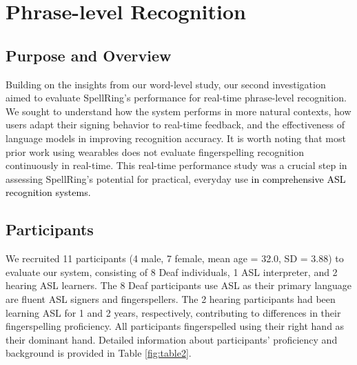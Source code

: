 \section{Phrase-level Recognition}

\subsection{Purpose and Overview}
Building on the insights from our word-level study, our second investigation aimed to evaluate SpellRing's performance for real-time phrase-level recognition. We sought to understand how the system performs in more natural contexts, how users adapt their signing behavior to real-time feedback, and the effectiveness of language models in improving recognition accuracy. It is worth noting that most prior work \cite{paudyal2017dyfav, mummadi2017real} using wearables does not evaluate fingerspelling recognition continuously in real-time. This real-time performance study was a crucial step in assessing SpellRing's potential for practical, everyday use \textcolor{black}{in comprehensive ASL recognition systems.}

\subsection{Participants}
We recruited 11 participants (4 male, 7 female, mean age = 32.0, SD = 3.88) to evaluate our system, consisting of 8 Deaf individuals, 1 ASL interpreter, and 2 hearing ASL learners. The 8 Deaf participants use ASL as their primary language are fluent ASL signers and fingerspellers. The 2 hearing participants had been learning ASL for 1 and 2 years, respectively, contributing to differences in their fingerspelling proficiency. All participants fingerspelled using their right hand as their dominant hand. Detailed information about participants’ proficiency and background is provided in Table \ref{fig:table2}.






